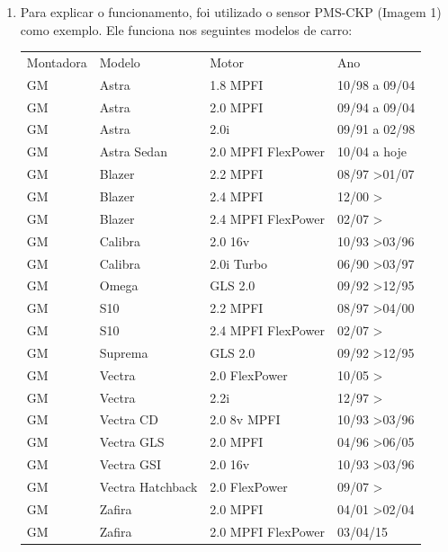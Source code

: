 \begin{enumerate}
  \item Para explicar o funcionamento, foi utilizado o sensor PMS-CKP (Imagem 1) como exemplo. Ele funciona nos seguintes modelos de carro:
  \begin{table}[h]
    \centering
    \begin{tabular}{llll}
    Montadora & Modelo           & Motor              & Ano                      \\
    GM        & Astra            & 1.8 MPFI           & 10/98 a 09/04            \\
    GM        & Astra            & 2.0 MPFI           & 09/94 a 09/04            \\
    GM        & Astra            & 2.0i               & 09/91 a 02/98            \\
    GM        & Astra Sedan      & 2.0 MPFI FlexPower & 10/04 a hoje             \\
    GM        & Blazer           & 2.2 MPFI           & 08/97 \textgreater 01/07 \\
    GM        & Blazer           & 2.4 MPFI           & 12/00 \textgreater       \\
    GM        & Blazer           & 2.4 MPFI FlexPower & 02/07 \textgreater       \\
    GM        & Calibra          & 2.0 16v            & 10/93 \textgreater 03/96 \\
    GM        & Calibra          & 2.0i Turbo         & 06/90 \textgreater 03/97 \\
    GM        & Omega            & GLS 2.0            & 09/92 \textgreater 12/95 \\
    GM        & S10              & 2.2 MPFI           & 08/97 \textgreater 04/00 \\
    GM        & S10              & 2.4 MPFI FlexPower & 02/07 \textgreater       \\
    GM        & Suprema          & GLS 2.0            & 09/92 \textgreater 12/95 \\
    GM        & Vectra           & 2.0 FlexPower      & 10/05 \textgreater       \\
    GM        & Vectra           & 2.2i               & 12/97 \textgreater       \\
    GM        & Vectra CD        & 2.0 8v MPFI        & 10/93 \textgreater 03/96 \\
    GM        & Vectra GLS       & 2.0 MPFI           & 04/96 \textgreater 06/05 \\
    GM        & Vectra GSI       & 2.0 16v            & 10/93 \textgreater 03/96 \\
    GM        & Vectra Hatchback & 2.0 FlexPower      & 09/07 \textgreater       \\
    GM        & Zafira           & 2.0 MPFI           & 04/01 \textgreater 02/04 \\
    GM        & Zafira           & 2.0 MPFI FlexPower & 03/04/15
    \end{tabular}
  \end{table}


\end{enumerate}
